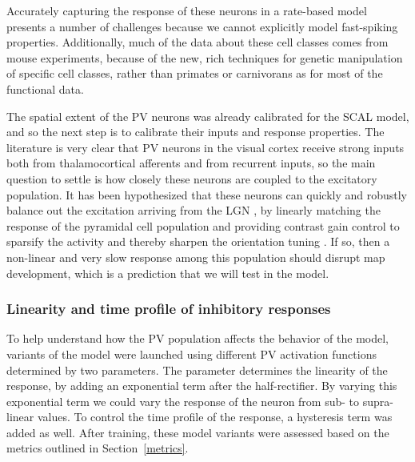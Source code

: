 Accurately capturing the response of these neurons in a rate-based
model presents a number of challenges because we cannot explicitly
model fast-spiking properties. Additionally, much of the data about
these cell classes comes from mouse experiments, because of the new,
rich techniques for genetic manipulation of specific cell classes,
rather than primates or carnivorans as for most of the functional
data.

The spatial extent of the PV neurons was already calibrated for the
SCAL model, and so the next step is to calibrate their inputs and
response properties. The literature is very clear that PV neurons in
the visual cortex receive strong inputs both from thalamocortical
afferents and from recurrent inputs, so the main question to settle is
how closely these neurons are coupled to the excitatory population. It
has been hypothesized that these neurons can quickly and robustly
balance out the excitation arriving from the LGN \citep{Swadlow2003,
  Burkhalter2008}, by linearly matching the response of the pyramidal
cell population and providing contrast gain control to sparsify the
activity and thereby sharpen the orientation tuning
\citep{Wilson2012}.  If so, then a non-linear and very slow response
among this population should disrupt map development, which is a
prediction that we will test in the model.

\subsubsection*{Linearity and time profile of inhibitory responses}

To help understand how the PV population affects the behavior of the
model, variants of the model were launched using different PV
activation functions determined by two parameters. The parameter
determines the linearity of the response, by adding an exponential
term after the half-rectifier. By varying this exponential term we
could vary the response of the neuron from sub- to supra-linear
values. To control the time profile of the response, a hysteresis term
was added as well. After training, these model variants were assessed
based on the metrics outlined in Section~\ref{metrics}.


